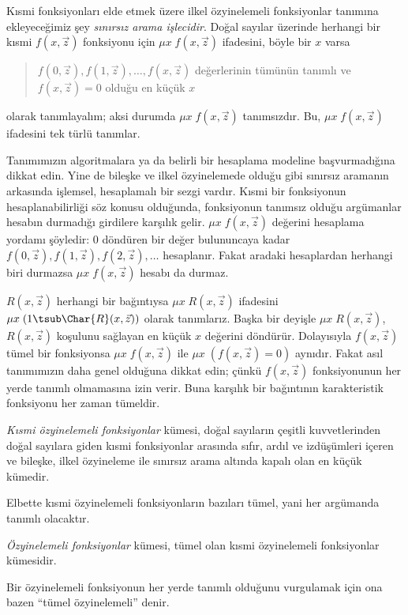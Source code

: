Kısmi fonksiyonları elde etmek üzere ilkel özyinelemeli fonksiyonlar tanımına
ekleyeceğimiz şey \emph{sınırsız arama işlecidir}. Doğal sayılar üzerinde
herhangi bir kısmi $f(x,\vec z)$ fonksiyonu için $\mu x\;f(x,\vec z)$
ifadesini, böyle bir $x$ varsa
\begin{quote}
  $f(0,\vec z),f(1,\vec z),\dots,f(x,\vec z)$ değerlerinin tümünün tanımlı
  ve $f(x,\vec z)=0$ olduğu en küçük $x$
\end{quote}
olarak tanımlayalım; aksi durumda $\mu x\;f(x,\vec z)$ tanımsızdır. Bu,
$\mu x\;f(x,\vec z)$ ifadesini tek türlü tanımlar.

\begin{explain}
Tanımımızın  algoritmalara ya da belirli
bir hesaplama modeline başvurmadığına dikkat edin. Yine de bileşke ve ilkel
özyinelemede olduğu gibi sınırsız aramanın arkasında işlemsel, hesaplamalı bir
sezgi vardır. Kısmi bir fonksiyonun hesaplanabilirliği söz konusu olduğunda,
fonksiyonun tanımsız olduğu argümanlar hesabın durmadığı girdilere karşılık
gelir. $\mu x\;f(x,\vec z)$ değerini hesaplama yordamı şöyledir:
$0$ döndüren bir değer bulununcaya kadar
$f(0,\vec z),f(1,\vec z),f(2,\vec z),\dots$ hesaplanır. Fakat aradaki
hesaplardan herhangi biri durmazsa $\mu x\;f(x,\vec z)$ hesabı da durmaz.
\end{explain}

$R(x,\vec z)$ herhangi bir bağıntıysa $\mu x\;R(x,\vec z)$ ifadesini
$\mu x\;(1\tsub\Char{R}(x,\vec z))$ olarak tanımlarız. Başka bir deyişle
$\mu x\;R(x,\vec z)$, $R(x,\vec z)$ koşulunu sağlayan en küçük $x$ değerini
döndürür. Dolayısıyla $f(x,\vec z)$ tümel bir fonksiyonsa
$\mu x\;f(x,\vec z)$ ile $\mu x\;(f(x,\vec z)=0)$ aynıdır. Fakat asıl
tanımımızın daha genel olduğuna dikkat edin; çünkü $f(x,\vec z)$ fonksiyonunun
her yerde tanımlı olmamasına izin verir. Buna karşılık bir bağıntının
karakteristik fonksiyonu her zaman tümeldir.

\begin{defn}
\emph{Kısmi özyinelemeli fonksiyonlar} kümesi, doğal sayıların çeşitli
kuvvetlerinden doğal sayılara giden kısmi fonksiyonlar arasında sıfır, ardıl
ve izdüşümleri içeren ve bileşke, ilkel özyineleme ile sınırsız arama altında
kapalı olan en küçük kümedir.
\end{defn}

Elbette kısmi özyinelemeli fonksiyonların bazıları tümel, yani her argümanda
tanımlı olacaktır.

\begin{defn}
\emph{Özyinelemeli fonksiyonlar} kümesi, tümel olan kısmi özyinelemeli
fonksiyonlar kümesidir.
\end{defn}

Bir özyinelemeli fonksiyonun her yerde tanımlı olduğunu vurgulamak için ona
bazen ``tümel özyinelemeli'' denir.

